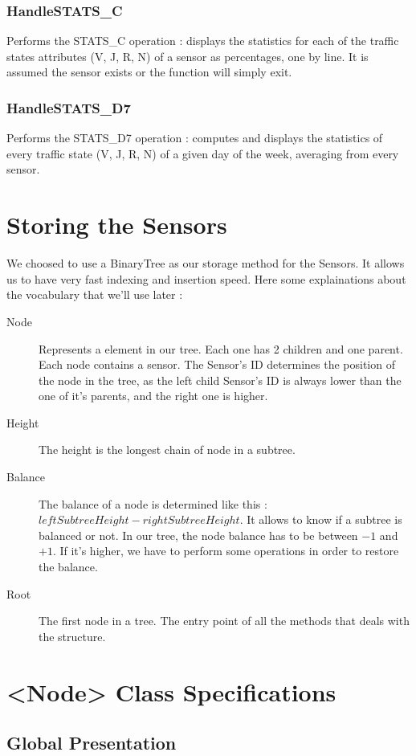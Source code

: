\documentclass[10pt]{article}
\begin{document}
\subsubsection*{HandleSTATS\_C}
Performs the STATS\_C operation : displays the statistics for each of the traffic states attributes (V, J, R, N) of a sensor as percentages, one by line. It is assumed the sensor exists or the function will simply exit.

\subsubsection*{HandleSTATS\_D7}
Performs the STATS\_D7 operation : computes and displays the statistics of every traffic state (V, J, R, N) of a given day of the week, averaging from every sensor.

\section{Storing the Sensors}
We choosed to use a BinaryTree as our storage method for the Sensors. It allows us to have very fast indexing and insertion speed.
Here some explainations about the vocabulary that we'll use later :
\begin{description}
	\item[Node] Represents a element in our tree. Each one has 2 children and one parent. Each node contains a sensor. The Sensor's ID determines the position of the node in the tree, as the left child Sensor's ID is always lower than the one of it's parents, and the right one is higher.
	\item[Height] The height is the longest chain of node in a subtree.
	\item[Balance] The balance of a node is determined like this : $ leftSubtreeHeight - rightSubtreeHeight$. It allows to know if a subtree is balanced or not. In our tree, the node balance has to be between $-1$ and $+1$. If it's higher, we have to perform some operations in order to restore the balance.
	\item[Root] The first node in a tree. The entry point of all the methods that deals with the structure.
\end{description}

\section{<Node> Class Specifications}
\subsection{Global Presentation}
\end{document}
